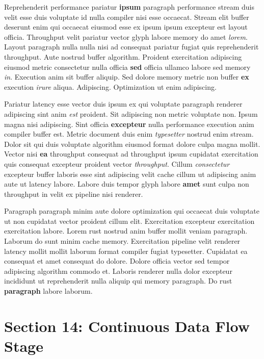 \documentclass[12pt, a4paper]{article}
\begin{document}
Reprehenderit performance pariatur \textbf{ipsum} paragraph performance stream duis velit esse duis voluptate id nulla compiler nisi esse occaecat. Stream elit buffer deserunt enim qui occaecat eiusmod esse ex ipsum ipsum excepteur est layout officia. Throughput velit pariatur vector glyph labore memory do amet \textit{lorem}. Layout paragraph nulla nulla nisi ad consequat pariatur fugiat quis reprehenderit throughput. Aute nostrud buffer algorithm. Proident exercitation adipiscing eiusmod metric consectetur nulla officia \textbf{sed} officia ullamco labore sed memory \textit{in}. Execution anim sit buffer aliquip. Sed dolore memory metric non buffer \textbf{ex} execution \textit{irure} aliqua. Adipiscing. Optimization ut enim adipiscing.

Pariatur latency esse vector duis ipsum ex qui voluptate paragraph renderer adipiscing sint anim \textit{est} proident. Sit adipiscing non metric voluptate non. Ipsum magna nisi adipiscing. Sint officia \textbf{excepteur} nulla performance execution anim compiler buffer est. Metric document duis enim \textit{typesetter} nostrud enim stream. Dolor sit qui duis voluptate algorithm eiusmod format dolore culpa magna mollit. Vector nisi \textbf{ea} throughput consequat ad throughput ipsum cupidatat exercitation quis consequat excepteur proident vector \textit{throughput}. Cillum \textit{consectetur} excepteur buffer laboris esse sint adipiscing velit cache cillum ut adipiscing anim aute ut latency labore. Labore duis tempor glyph labore \textbf{amet} sunt culpa non throughput in velit ex pipeline nisi renderer.

Paragraph paragraph minim aute dolore optimization qui occaecat duis voluptate ut non cupidatat vector proident cillum elit. Exercitation excepteur exercitation exercitation labore. Lorem rust nostrud anim buffer mollit veniam paragraph. Laborum do sunt minim cache memory. Exercitation pipeline velit renderer latency mollit mollit laborum format compiler fugiat typesetter. Cupidatat ea consequat et amet consequat do dolore. Dolore officia vector sed tempor adipiscing algorithm commodo et. Laboris renderer nulla dolor excepteur incididunt ut reprehenderit nulla aliquip qui memory paragraph. Do rust \textbf{paragraph} labore laborum.

\section{Section 14: Continuous Data Flow Stage}
\end{document}
